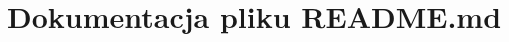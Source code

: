 \hypertarget{_r_e_a_d_m_e_8md}{}\section{Dokumentacja pliku R\+E\+A\+D\+M\+E.\+md}
\label{_r_e_a_d_m_e_8md}
